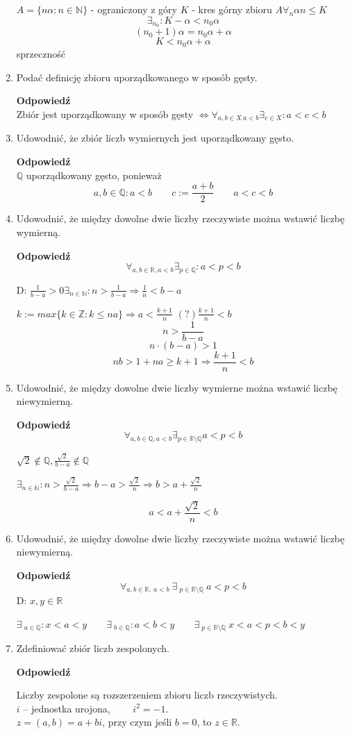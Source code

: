 \documentclass[12pt,a4paper]{article}
\theoremstyle{break}
\newcommand{\Odp}[1]{
		\begin{mdframed}[style=zadanie]
			\textbf{Odpowiedź}\\
			#1
		\end{mdframed}
	}
\newcommand{\witw}{$\Leftrightarrow$}
\begin{document}
\begin{enumerate}[1.]
{		$A=\{n\alpha : n\in\mathbb{N}\}$ - ograniczony z góry
		$K$ - kres górny zbioru $A \forall_n \alpha n \leq K$
		$$\exists_{n_0}: K-\alpha < n_0\alpha$$
		$$(n_0+1)\alpha = n_0\alpha + \alpha$$
		$$K<n_0\alpha + \alpha$$ sprzeczność
	}
	
	\item Podać definicję zbioru uporządkowanego w sposób gęsty.
	\Odp{
		Zbiór jest uporządkowany w sposób gęsty \witw $\forall_{a,b\in X \: a<b} \exists_{c\in X}: a<c<b$
	}
	
	\item Udowodnić, że zbiór liczb wymiernych jest uporządkowany gęsto.
	\Odp{
		$\mathbb{Q}$ uporządkowany gęsto, ponieważ
		$$a,b\in\mathbb{Q}: a<b \qquad c:= \frac{a+b}{2} \qquad a<c<b$$
	}
	
	\item Udowodnić, że między dowolne dwie liczby rzeczywiste można wstawić liczbę wymierną.
	\Odp{
		$$\forall_{a,b\in \mathbb{R}, a<b}\exists_{p\in\mathbb{Q}}: a<p<b$$
		
		D: $\frac{1}{b-a}>0 \exists_{n\in\mathbb{N}}: n>\frac{1}{b-a} \Rightarrow \frac{1}{n}<b-a$
		
		$k:=max\{k\in\mathbb{Z}: k\leq na\} \Rightarrow a<\frac{k+1}{n}$
		$(?) \frac{k+1}{n}<b$
		$$n>\frac{1}{b-a}$$
		$$n\cdot(b-a)>1$$
		$$nb>1+na\geq k+1 \Rightarrow \frac{k+1}{n}<b$$
		 
	}
	\newpage
	\item Udowodnić, że między dowolne dwie liczby wymierne można wstawić liczbę niewymierną.
	\Odp{
		$$\forall_{a,b\in \mathbb{Q}, a<b} \exists_{p\in \mathbb{R}\setminus\mathbb{Q}} a<p<b$$
		
		$\sqrt{2}\notin\mathbb{Q}, \frac{\sqrt{2}}{b-a}\notin\mathbb{Q}$
		
		$\exists_{n\in\mathbb{N}}: n>\frac{\sqrt{2}}{b-a}\Rightarrow b-a > \frac{\sqrt{2}}{n} \Rightarrow b>a+\frac{\sqrt{2}}{n}$
		
		$$a<a+\frac{\sqrt{2}}{n}<b$$
	}
	
	\item Udowodnić, że między dowolne dwie liczby rzeczywiste można wstawić liczbę niewymierną.
	\Odp{
		$$\forall_{a,b\in \mathbb{R},\: a<b} \:\exists\:_{p\in \mathbb{R}\setminus\mathbb{Q}} \:a<p<b$$
		D: $x,y\in\mathbb{R}$
		
		$\exists\:_{a\in \mathbb{Q}}: x<a<y \qquad \exists\:_{b\in\mathbb{Q}} : a<b<y 
		\qquad\exists\:_{p\in \mathbb{R}\setminus\mathbb{Q}}\: x<a<p<b<y$
	}
	
	\item Zdefiniować zbiór liczb zespolonych.
	\Odp{
			\noindent
			\begin{minipage}[t]{0.55\textwidth}
				\vspace{0pt}  %
				Liczby zespolone są rozszerzeniem zbioru liczb rzeczywistych.\\[0.5em]
				$i$ – jednostka urojona,  $\qquad i^2 = -1$.\\[0.5em]
				$z = (a, b) = a + bi$, przy czym jeśli $b = 0$, to $z \in \mathbb{R}$.\\[0.5em]
				

\end{minipage}}
\end{enumerate}
\end{document}
